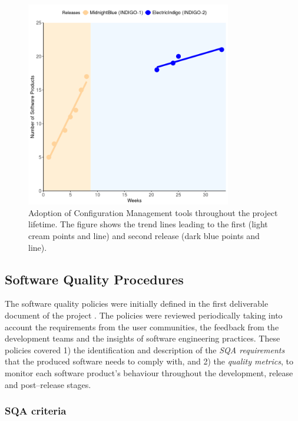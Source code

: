 \begin{figure}[ht]
\centering
\includegraphics[width=0.8\textwidth]{images/fig3.png}
\caption{Adoption of Configuration Management tools throughout the project lifetime. The figure shows the trend lines
leading to the first (light cream points and line) and second release (dark blue points and line).}
\label{fig:fig_confman}
\end{figure}

\subsection{Software Quality Procedures}\label{software-quality-procedures}
\label{subsec:sqa}

The software quality policies were initially defined in the first deliverable document of the
project \cite{indigo-d31}. The policies were reviewed periodically taking into account the requirements
from the user communities, the feedback from the development teams and the insights of software
engineering practices. These policies covered 1) the identification
and description of the \emph{SQA requirements} that the produced software needs
to comply with, and 2) the \emph{quality metrics}, to monitor each software product's
behaviour throughout the development, release and post--release stages.

\subsubsection{SQA criteria}

